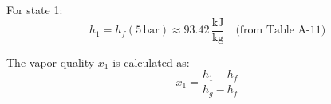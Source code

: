 For state 1:  
\[
h_1 = h_f(5 \, \text{bar}) \approx 93.42 \, \frac{\text{kJ}}{\text{kg}} \quad \text{(from Table A-11)}  
\]

The vapor quality \( x_1 \) is calculated as:  
\[
x_1 = \frac{h_1 - h_f}{h_g - h_f}  
\]